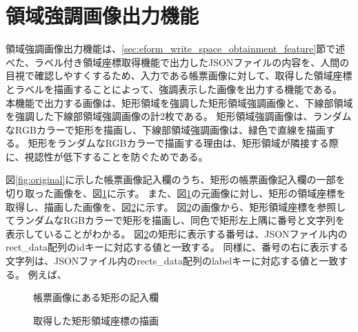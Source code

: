 \section{領域強調画像出力機能}\label{sec:highlighted_area_image_output}
領域強調画像出力機能は、\ref{sec:eform_write_space_obtainment_feature}節で述べた、ラベル付き領域座標取得機能で出力したJSONファイルの内容を、人間の目視で確認しやすくするため、入力である帳票画像に対して、取得した領域座標とラベルを描画することによって、強調表示した画像を出力する機能である。
本機能で出力する画像は、矩形領域を強調した矩形領域強調画像と、下線部領域を強調した下線部領域強調画像の計2枚である。
矩形領域強調画像は、ランダムなRGBカラーで矩形を描画し、下線部領域強調画像は、緑色で直線を描画する。
矩形をランダムなRGBカラーで描画する理由は、矩形領域が隣接する際に、視認性が低下することを防ぐためである。

図\ref{fig:original}に示した帳票画像記入欄のうち、矩形の帳票画像記入欄の一部を切り取った画像を、図\ref{fig:rect_original}に示す。
また、図\ref{fig:rect_original}の元画像に対し、矩形の領域座標を取得し、描画した画像を、図\ref{fig:rect_drawing}に示す。
図\ref{fig:rect_drawing}の画像から、矩形領域座標を参照してランダムなRGBカラーで矩形を描画し、同色で矩形左上隅に番号と文字列を表示していることがわかる。
図\ref{fig:rect_drawing}の矩形に表示する番号は、JSONファイル内のrect\_data配列のidキーに対応する値と一致する。
同様に、番号の右に表示する文字列は、JSONファイル内のrects\_data配列のlabelキーに対応する値と一致する。
例えば、

\begin{figure}[t]
    \begin{center}
        \caption{帳票画像にある矩形の記入欄}
        \label{fig:rect_original}
    \end{center}
\end{figure}

\begin{figure}[t]
    \begin{center}
        \caption{取得した矩形領域座標の描画}
        \label{fig:rect_drawing}
    \end{center}
\end{figure}

